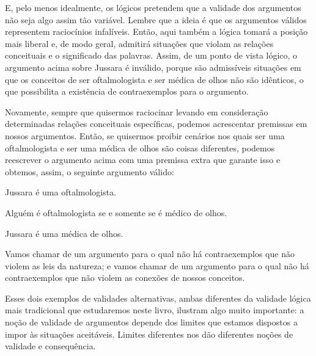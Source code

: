 E, pelo menos idealmente, os lógicos pretendem que a validade dos argumentos não seja algo assim tão variável.
Lembre que a ideia é que os argumentos válidos representem raciocínios infalíveis.
Então, aqui também a lógica tomará a posição mais liberal e, de modo geral, admitirá situações que violam as relações conceituais e o significado das palavras.
Assim, de um ponto de vista lógico, o argumento acima sobre Jussara é inválido, porque são admissíveis situações em que os conceitos de ser oftalmologista e ser médica de olhos não são idênticos, o que possibilita a existência de contraexemplos para o argumento.

Novamente, sempre que quisermos raciocinar levando em consideração determinadas relações conceituais específicas, podemos acrescentar premissas em nossos argumentos.
Então, se quisermos proibir cenários nos quais ser uma oftalmologista e ser uma médica de olhos são coisas diferentes, podemos reescrever o argumento acima com uma premissa extra que garante isso e obtemos, assim, o seguinte argumento válido:

	\begin{earg}
		\item[] Jussara é uma oftalmologista.
		\item[] Alguém é oftalmologista se e somente se é médico de olhos.
		\item[\therefore] Jussara é uma médica de olhos.
	\end{earg}
Vamos chamar de \label{nomoval} um argumento para o qual não há contraexemplos que não violem as leis da natureza; e vamos chamar de  um argumento para o qual não há contraexemplos que não violem as conexões de nossos conceitos.

Esses dois exemplos de validades alternativas, ambas diferentes da validade lógica mais tradicional que estudaremos neste livro, ilustram algo muito importante:
a noção de validade de argumentos depende dos limites que estamos dispostos a impor às situações aceitáveis.
Limites diferentes nos dão diferentes noções de validade e consequência.



